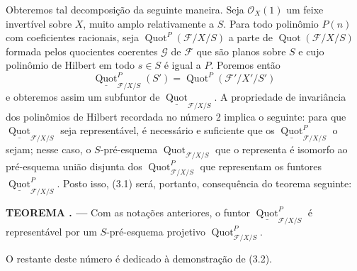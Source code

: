\documentclass[11pt,twoside,openany]{book}
\numberwithin{equation}{section}
\newcommand{\src}[1]{%
  \phantomsection\hypertarget{src:#1}{}%
  \marginpar{\raggedleft\footnotesize\sffamily #1}%
}
\theoremstyle{plain}
\theoremstyle{definition}
\theoremstyle{remark}
\newcommand{\result}[2]{%
  \par\medskip\noindent\textbf{#1%
  \if\relax\detokenize{#2}\relax\else\space#2\fi. ---}\enspace
}
\newcommand{\FgaUnitKey}{frontmatter}
\renewcommand{\src}[1]{%
  \phantomsection\hypertarget{src:\FgaUnitKey:#1}{}%
  \marginpar{\raggedleft\footnotesize\sffamily #1}%
}
\begin{document}
Obteremos tal decomposição da seguinte maneira. Seja $\mathcal O_X(1)$ um
feixe invertível sobre $X$, muito amplo relativamente a $S$. Para todo
polinômio $P(n)$ com coeficientes racionais, seja
$\operatorname{Quot}^P(\mathcal F/X/S)$ a parte de
$\operatorname{Quot}(\mathcal F/X/S)$ formada pelos quocientes coerentes
$\mathcal G$ de $\mathcal F$ que são planos sobre $S$ e cujo polinômio de
Hilbert em todo $s\in S$ é igual a $P$. Poremos então
\[
\underline{\operatorname{Quot}}^P_{\mathcal F/X/S}(S')
=\operatorname{Quot}^P(\mathcal F'/X'/S')
\]
e obteremos assim um subfuntor de
$\underline{\operatorname{Quot}}_{\mathcal F/X/S}$. A propriedade de
invariância dos polinômios de Hilbert recordada no número 2 implica o seguinte:
para que $\underline{\operatorname{Quot}}_{\mathcal F/X/S}$ seja
representável, é necessário e suficiente que os
$\underline{\operatorname{Quot}}^P_{\mathcal F/X/S}$ o sejam; nesse caso, o
$S$-pré-esquema $\operatorname{Quot}_{\mathcal F/X/S}$ que o representa é
isomorfo ao pré-esquema união disjunta dos
$\operatorname{Quot}^P_{\mathcal F/X/S}$ que representam os funtores
$\underline{\operatorname{Quot}}^P_{\mathcal F/X/S}$. Posto isso, (3.1)
será, portanto, consequência do teorema seguinte:
\src{260}
\result{TEOREMA}{3.2} Com as notações anteriores, o funtor
$\underline{\operatorname{Quot}}^P_{\mathcal F/X/S}$ é representável por um
$S$-pré-esquema projetivo $\operatorname{Quot}^P_{\mathcal F/X/S}$.

O restante deste número é dedicado à demonstração de (3.2).
\end{document}
